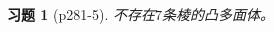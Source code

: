 \documentclass{article}
\begin{document}
\begin{CJK}{UTF8}{gbsn}
  \newtheorem*{Exercise}{习题}
  \huge
\begin{Exercise}[p281-5]
  不存在$7$条棱的凸多面体。
\end{Exercise}

\end{CJK}
\end{document}
